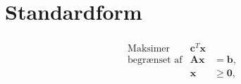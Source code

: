 \section{Standardform}
% 

\begin{align*}
\begin{array}{lrl}
\text{Maksimer}		&\textbf{c}^T\textbf{x}	&				\\
\text{begrænset af}	&\textbf{A}\textbf{x}	&=\mathbf{b},	\\
					&\mathbf{x}				&\geq \mathbf{0},		
\end{array}
\end{align*}